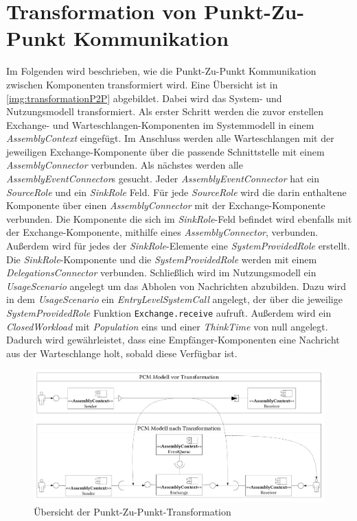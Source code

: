 \section{Transformation von Punkt-Zu-Punkt Kommunikation}
Im Folgenden wird beschrieben, wie die Punkt-Zu-Punkt Kommunikation zwischen Komponenten transformiert wird. Eine Übersicht ist in \autoref{img:transformationP2P} abgebildet. Dabei wird das System- und Nutzungsmodell transformiert. Als erster Schritt werden die zuvor erstellen Exchange- und Warteschlangen-Komponenten im Systemmodell in einem \emph{AssemblyContext} eingefügt. Im Anschluss werden alle Warteschlangen mit der jeweiligen Exchange-Komponente über die passende Schnittstelle mit einem \emph{AssemblyConnector} verbunden. Als nächstes werden alle \emph{AssemblyEventConnector}s gesucht. Jeder \emph{AssemblyEventConnector} hat ein \emph{SourceRole} und ein \emph{SinkRole} Feld. Für jede \emph{SourceRole} wird die darin enthaltene Komponente über einen \emph{AssemblyConnector} mit der Exchange-Komponente verbunden. Die Komponente die sich im \emph{SinkRole}-Feld befindet wird ebenfalls mit der Exchange-Komponente, mithilfe eines \emph{AssemblyConnector}, verbunden. Außerdem wird für jedes der \emph{SinkRole}-Elemente eine \emph{SystemProvidedRole} erstellt. Die \emph{SinkRole}-Komponente und die \emph{SystemProvidedRole} werden mit einem \emph{DelegationsConnector} verbunden. Schließlich wird im Nutzungsmodell ein \emph{UsageScenario} angelegt um das Abholen von Nachrichten abzubilden. Dazu wird in dem \emph{UsageScenario} ein \emph{EntryLevelSystemCall} angelegt, der über die jeweilige \emph{SystemProvidedRole} Funktion \texttt{Exchange.receive} aufruft. Außerdem wird ein \emph{ClosedWorkload} mit \emph{Population} eins und einer \emph{ThinkTime} von null angelegt. Dadurch wird gewährleistet, dass eine Empfänger-Komponenten eine Nachricht aus der Warteschlange holt, sobald diese Verfügbar ist.

\begin{figure}
\center
  \includegraphics[width=1.3\textwidth, angle=90]{images/transformation/transformationSystemP2P.pdf}
  \caption{Übersicht der Punkt-Zu-Punkt-Transformation}
  \label{img:transformationP2P}
\end{figure}

